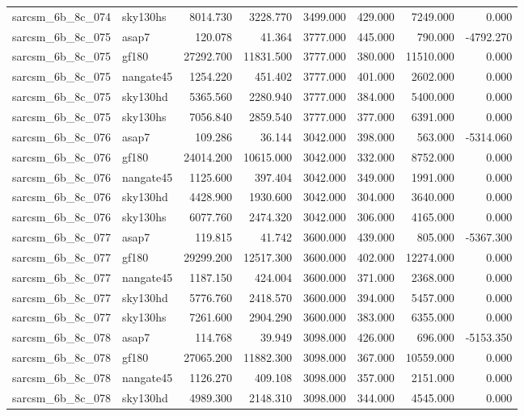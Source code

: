 \begin{tabular}{llrrrrrr}
sarcsm\_6b\_8c\_074 & sky130hs & 8014.730 & 3228.770 & 3499.000 & 429.000 & 7249.000 & 0.000 \\
sarcsm\_6b\_8c\_075 & asap7 & 120.078 & 41.364 & 3777.000 & 445.000 & 790.000 & -4792.270 \\
sarcsm\_6b\_8c\_075 & gf180 & 27292.700 & 11831.500 & 3777.000 & 380.000 & 11510.000 & 0.000 \\
sarcsm\_6b\_8c\_075 & nangate45 & 1254.220 & 451.402 & 3777.000 & 401.000 & 2602.000 & 0.000 \\
sarcsm\_6b\_8c\_075 & sky130hd & 5365.560 & 2280.940 & 3777.000 & 384.000 & 5400.000 & 0.000 \\
sarcsm\_6b\_8c\_075 & sky130hs & 7056.840 & 2859.540 & 3777.000 & 377.000 & 6391.000 & 0.000 \\
sarcsm\_6b\_8c\_076 & asap7 & 109.286 & 36.144 & 3042.000 & 398.000 & 563.000 & -5314.060 \\
sarcsm\_6b\_8c\_076 & gf180 & 24014.200 & 10615.000 & 3042.000 & 332.000 & 8752.000 & 0.000 \\
sarcsm\_6b\_8c\_076 & nangate45 & 1125.600 & 397.404 & 3042.000 & 349.000 & 1991.000 & 0.000 \\
sarcsm\_6b\_8c\_076 & sky130hd & 4428.900 & 1930.600 & 3042.000 & 304.000 & 3640.000 & 0.000 \\
sarcsm\_6b\_8c\_076 & sky130hs & 6077.760 & 2474.320 & 3042.000 & 306.000 & 4165.000 & 0.000 \\
sarcsm\_6b\_8c\_077 & asap7 & 119.815 & 41.742 & 3600.000 & 439.000 & 805.000 & -5367.300 \\
sarcsm\_6b\_8c\_077 & gf180 & 29299.200 & 12517.300 & 3600.000 & 402.000 & 12274.000 & 0.000 \\
sarcsm\_6b\_8c\_077 & nangate45 & 1187.150 & 424.004 & 3600.000 & 371.000 & 2368.000 & 0.000 \\
sarcsm\_6b\_8c\_077 & sky130hd & 5776.760 & 2418.570 & 3600.000 & 394.000 & 5457.000 & 0.000 \\
sarcsm\_6b\_8c\_077 & sky130hs & 7261.600 & 2904.290 & 3600.000 & 383.000 & 6355.000 & 0.000 \\
sarcsm\_6b\_8c\_078 & asap7 & 114.768 & 39.949 & 3098.000 & 426.000 & 696.000 & -5153.350 \\
sarcsm\_6b\_8c\_078 & gf180 & 27065.200 & 11882.300 & 3098.000 & 367.000 & 10559.000 & 0.000 \\
sarcsm\_6b\_8c\_078 & nangate45 & 1126.270 & 409.108 & 3098.000 & 357.000 & 2151.000 & 0.000 \\
sarcsm\_6b\_8c\_078 & sky130hd & 4989.300 & 2148.310 & 3098.000 & 344.000 & 4545.000 & 0.000 \\

\end{tabular}
